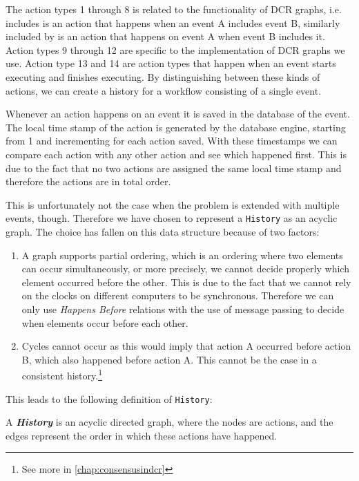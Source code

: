	\newpar The action types 1 through 8 is related to the functionality of DCR graphs, i.e. includes is an action that happens when an event A includes event B, similarly included by is an action that happens on event A when event B includes it. Action types 9 through 12 are specific to the implementation of DCR graphs we use. Action type 13 and 14 are action types that happen when an event starts executing and finishes executing. By distinguishing between these kinds of actions, we can create a history for a workflow consisting of a single event. 
	
	\newpar Whenever an action happens on an event it is saved in the database of the event. The local time stamp of the action is generated by the database engine, starting from 1 and incrementing for each action saved. With these timestamps we can compare each action with any other action and see which happened first. This is due to the fact that no two actions are assigned the same local time stamp and therefore the actions are in total order.

	\newpar This is unfortunately not the case when the problem is extended with multiple events, though. Therefore we have chosen to represent a \texttt{History} as an acyclic graph. The choice has fallen on this data structure because of two factors:
	
	\begin{enumerate}
		\item A graph supports partial ordering, which is an ordering where two elements can occur simultaneously, or more precisely, we cannot decide properly which element occurred before the other. This is due to the fact that we cannot rely on the clocks on different computers to be synchronous. Therefore we can only use \textit{Happens Before} relations with the use of message passing to decide when elements occur before each other.
	
		\item Cycles cannot occur as this would imply that action A occurred before action B, which also happened before action A. This cannot be the case in a consistent history.\footnote{See more in \autoref{chap:consensusindcr}}
	\end{enumerate}

	
	\newpar This leads to the following definition of \texttt{History}:
	
	\begin{definition}
		A \textit{\textbf{History}} is an acyclic directed graph, where the nodes are actions, and the edges represent the order in which these actions have happened.
	\end{definition}
	

